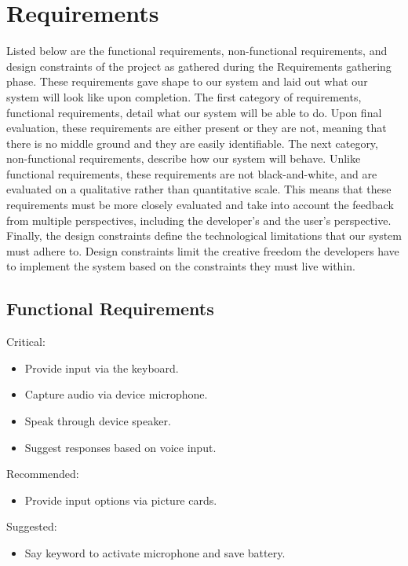 \chapter{Requirements}

Listed below are the functional requirements, non-functional requirements, and design constraints of the project as gathered during the Requirements gathering phase. These requirements gave shape to our system and laid out what our system will look like upon completion. The first category of requirements, functional requirements, detail what our system will be able to do. Upon final evaluation, these requirements are either present or they are not, meaning that there is no middle ground and they are easily identifiable. The next category, non-functional requirements, describe how our system will behave. Unlike functional requirements, these requirements are not black-and-white, and are evaluated on a qualitative rather than quantitative scale. This means that these requirements must be more closely evaluated and take into account the feedback from multiple perspectives, including the developer's and the user's perspective. Finally, the design constraints define the technological limitations that our system must adhere to. Design constraints limit the creative freedom the developers have to implement the system based on the constraints they must live within.

\section{Functional Requirements}
Critical:
\begin{itemize}
\item Provide input via the keyboard.
\item Capture audio via device microphone.
\item Speak through device speaker.
\item Suggest responses based on voice input.
\end{itemize}
Recommended:
\begin{itemize}
\item Provide input options via picture cards.
\end{itemize}
Suggested:
\begin{itemize}
\item Say keyword to activate microphone and save battery.
\end{itemize}

